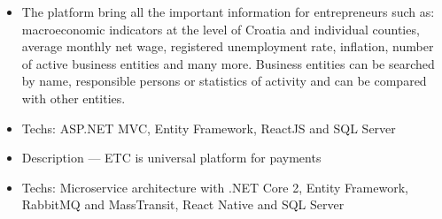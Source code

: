 \documentclass[12pt,a4paper]{altacv}
\begin{document}
\begin{itemize}
  \item \small{The platform bring all the important information for entrepreneurs such as: macroeconomic indicators at the level of Croatia and individual counties, average monthly net wage, registered unemployment rate, inflation, number of active business entities and many more. Business entities can be searched by name, responsible persons or statistics of activity and can be compared with other entities.}
  \item Techs: ASP.NET MVC, Entity Framework, ReactJS and SQL Server
\end{itemize}

\divider

%



\begin{itemize}
  \item Description --- ETC is universal platform for payments
  \item Techs: Microservice architecture with .NET Core 2, Entity Framework, RabbitMQ and MassTransit, React Native and SQL Server
\end{itemize}




\divider


\divider





\end{document}
